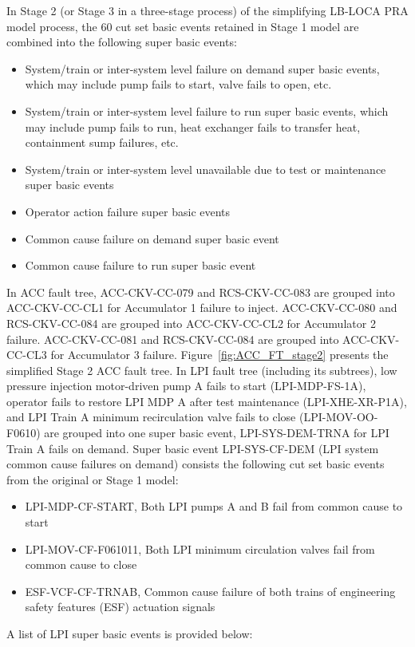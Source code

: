 In Stage 2 (or Stage 3 in a three-stage process) of the simplifying LB-LOCA PRA model process, the 60 cut set basic events retained in Stage 1 model are combined into the following super basic events:
\begin{itemize}
    \item System/train or inter-system level failure on demand super basic events, which may include pump fails to start, valve fails to open, etc.
    \item System/train or inter-system level failure to run super basic events, which may include pump fails to run, heat exchanger fails to transfer heat, containment sump failures, etc.
    \item System/train or inter-system level unavailable due to test or maintenance super basic events
    \item Operator action failure super basic events
    \item Common cause failure on demand super basic event
    \item Common cause failure to run super basic event
\end{itemize}
In ACC fault tree, ACC-CKV-CC-079 and RCS-CKV-CC-083 are grouped into ACC-CKV-CC-CL1 for Accumulator 1 failure to inject. ACC-CKV-CC-080 and RCS-CKV-CC-084 are grouped into ACC-CKV-CC-CL2 for Accumulator 2 failure. ACC-CKV-CC-081 and RCS-CKV-CC-084 are grouped into ACC-CKV-CC-CL3 for Accumulator 3 failure. 
Figure~\ref{fig:ACC_FT_stage2} presents the simplified Stage 2 ACC fault tree.
In LPI fault tree (including its subtrees), low pressure injection motor-driven pump A fails to start (LPI-MDP-FS-1A), operator fails to restore LPI MDP A after test maintenance (LPI-XHE-XR-P1A), and LPI Train A minimum recirculation valve fails to close (LPI-MOV-OO-F0610) are grouped into one super basic event, LPI-SYS-DEM-TRNA for LPI Train A fails on demand. Super basic event LPI-SYS-CF-DEM (LPI system common cause failures on demand) consists the following cut set basic events from the original or Stage 1 model:
\begin{itemize}
    \item LPI-MDP-CF-START, Both LPI pumps A and B fail from common cause to start
    \item LPI-MOV-CF-F061011, Both LPI minimum circulation valves fail from common cause to close
    \item ESF-VCF-CF-TRNAB, Common cause failure of both trains of engineering safety features (ESF) actuation signals
\end{itemize}
A list of LPI super basic events is provided below: 
